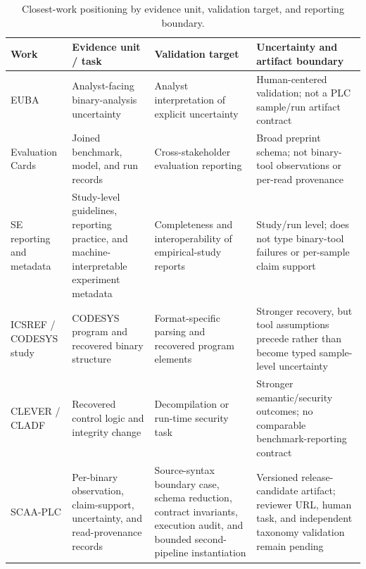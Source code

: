 \documentclass[manuscript,screen,review]{acmart}
\begin{document}
\begin{table}[t]
\centering
\small
\caption{Closest-work positioning by evidence unit, validation target, and reporting boundary.}
\label{tab:closest_work}
\begin{tabularx}{\textwidth}{>{\raggedright\arraybackslash}p{}>{\raggedright\arraybackslash}p{}>{\raggedright\arraybackslash}p{}>{\raggedright\arraybackslash}X}
\toprule
Work & Evidence unit / task & Validation target & Uncertainty and artifact boundary \\
\midrule
EUBA~\cite{euba_sandia2021} & Analyst-facing binary-analysis uncertainty & Analyst interpretation of explicit uncertainty & Human-centered validation; not a PLC sample/run artifact contract \\
Evaluation Cards~\cite{evaluation_cards_arxiv2026} & Joined benchmark, model, and run records & Cross-stakeholder evaluation reporting & Broad preprint schema; not binary-tool observations or per-read provenance \\
SE reporting and metadata~\cite{kitchenham_reporting2008,revoredo_reporting2021,santana_metadata2026} & Study-level guidelines, reporting practice, and machine-interpretable experiment metadata & Completeness and interoperability of empirical-study reports & Study/run level; does not type binary-tool failures or per-sample claim support \\
ICSREF / CODESYS study~\cite{icsref_ndss2019,benkraouda_codesys2023} & CODESYS program and recovered binary structure & Format-specific parsing and recovered program elements & Stronger recovery, but tool assumptions precede rather than become typed sample-level uncertainty \\
CLEVER / CLADF~\cite{clever_tifs2024,cladf_jiot2024} & Recovered control logic and integrity change & Decompilation or run-time security task & Stronger semantic/security outcomes; no comparable benchmark-reporting contract \\
SCAA-PLC & Per-binary observation, claim-support, uncertainty, and read-provenance records & Source-syntax boundary case, schema reduction, contract invariants, execution audit, and bounded second-pipeline instantiation & Versioned release-candidate artifact; reviewer URL, human task, and independent taxonomy validation remain pending \\
\bottomrule
\end{tabularx}
\end{table}


\end{document}
